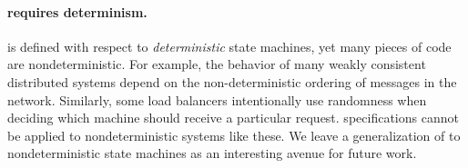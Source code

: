\paragraph{\Watprovenance{} requires determinism.}
\Watprovenance{} is defined with respect to \emph{deterministic} state
machines, yet many pieces of code are nondeterministic. For example, the
behavior of many weakly consistent distributed systems depend on the
non-deterministic ordering of messages in the network. Similarly, some load
balancers intentionally use randomness when deciding which machine should
receive a particular request.
%
\Watprovenance{} specifications cannot be applied to nondeterministic systems
like these. We leave a generalization of \watprovenance{} to nondeterministic
state machines as an interesting avenue for future work.
